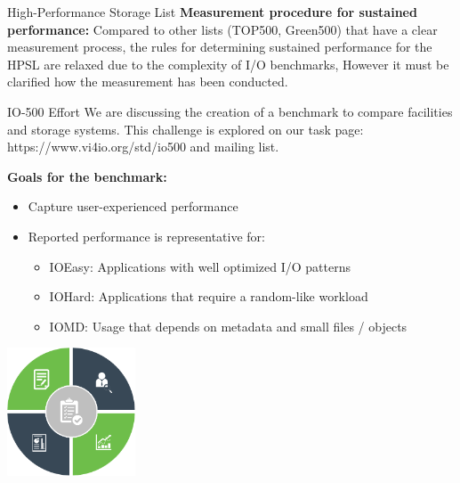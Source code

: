 \documentclass[portrait,a0paper,fontscale=0.4]{baposter}
\begin{document}
\begin{poster}
\begin{posterbox}[name=schedule,column=1,span=2, below=concept]{High-Performance Storage List}
\textbf{Measurement procedure for sustained performance:}
Compared to other lists (TOP500, Green500) that have a clear measurement process, the rules for determining sustained performance for the HPSL are relaxed due to the complexity of I/O benchmarks, However it must be clarified how the measurement has been conducted.
\end{posterbox}

\begin{posterbox}[name=HHCC,column=1,span=2, below=schedule, above=bottom]{IO-500 Effort}
We are discussing the creation of a benchmark to compare facilities and storage systems. This challenge is explored on our task page: https://www.vi4io.org/std/io500 and mailing list. 

\textbf{Goals for the benchmark:}

\vspace*{-0.5em}

\begin{minipage}{10.5cm}
\begin{itemize}
\item Capture user-experienced performance %
\item Reported performance is representative for:
\vspace*{-0.5em}
\begin{itemize}
\item IOEasy: Applications with well optimized I/O patterns
\item IOHard: Applications that require a random-like workload
\item IOMD: Usage that depends on metadata and small files / objects
\end{itemize}
\end{itemize}
\end{minipage}
\qquad
\begin{minipage}{4cm}
\includegraphics[width=3.8cm]{border}
\end{minipage}

\vspace*{-1em}


\end{posterbox}
\end{poster}
\end{document}
